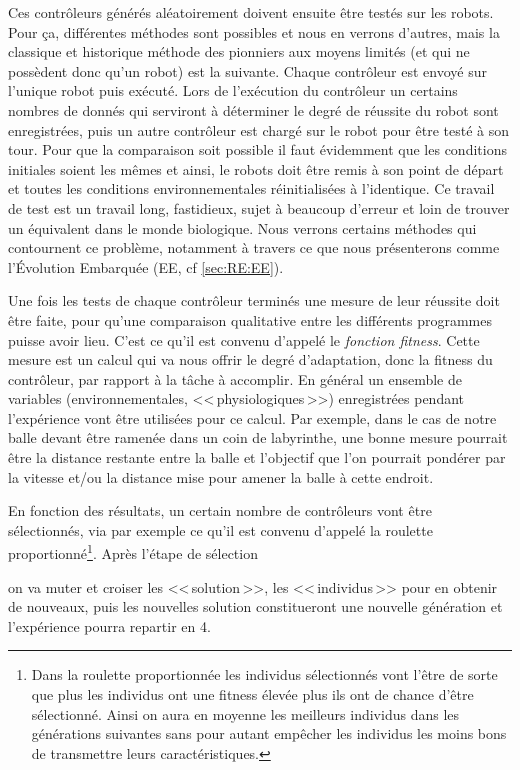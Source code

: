 \begin{inparaenum}[(\itshape 1\upshape)]
\item Ces contrôleurs générés aléatoirement doivent ensuite être testés sur les robots. Pour ça, différentes méthodes sont possibles et nous en verrons d'autres, mais la classique et historique méthode des pionniers aux moyens limités (et qui ne possèdent donc qu'un robot) est la suivante. Chaque contrôleur est envoyé sur l'unique robot puis exécuté. Lors de l'exécution du contrôleur un certains nombres de donnés qui serviront à déterminer le degré de réussite du robot sont enregistrées, puis un autre contrôleur est chargé sur le robot pour être testé à son tour. Pour que la comparaison soit possible il faut évidemment que les conditions initiales soient les mêmes et ainsi, le robots doit être remis à son point de départ et toutes les conditions environnementales réinitialisées à l'identique. Ce travail de test est un travail long, fastidieux, sujet à beaucoup d'erreur et loin de trouver un équivalent dans le monde biologique. Nous verrons certains méthodes qui contournent ce problème, notamment à travers ce que nous présenterons comme l'Évolution Embarquée (EE, cf \ref{sec:RE:EE}). \label{it:test}

\item Une fois les tests de chaque contrôleur terminés une mesure de leur réussite doit être faite, pour qu'une comparaison qualitative entre les différents programmes puisse avoir lieu. C'est ce qu'il est convenu d'appelé le \emph{fonction fitness}.  Cette mesure est un calcul qui va nous offrir le degré d'adaptation, donc la fitness du contrôleur, par rapport à la tâche à accomplir. En général un ensemble de variables (environnementales, <<\,physiologiques\,>>) enregistrées pendant l'expérience vont être utilisées pour ce calcul. Par exemple, dans le cas de notre balle devant être ramenée dans un coin de labyrinthe, une bonne mesure pourrait être la distance restante entre la balle et l'objectif que l'on pourrait pondérer par la vitesse et/ou la distance mise pour amener la balle à cette endroit.
\item En fonction des résultats, un certain nombre de contrôleurs vont être sélectionnés, via par exemple ce qu'il est convenu d'appelé la roulette proportionné\footnote{Dans la roulette proportionnée les individus sélectionnés vont l'être de sorte que plus les individus ont une fitness élevée plus ils ont de chance d'être sélectionné. Ainsi on aura en moyenne les meilleurs individus dans les générations suivantes sans pour autant empêcher les individus les moins bons de transmettre leurs caractéristiques.}. Après l'étape de sélection \item on va muter et croiser les <<\,solution\,>>, les <<\,individus\,>> pour en obtenir de nouveaux, puis les nouvelles solution constitueront une nouvelle génération et l'expérience pourra repartir en 4. 
\end{inparaenum}


